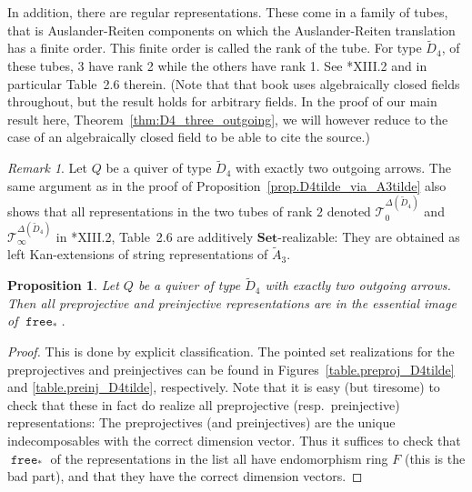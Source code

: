 \documentclass[a4paper]{amsart}
\theoremstyle{plain}
\newtheorem{proposition}[theorem]{Proposition}
\theoremstyle{definition}
\theoremstyle{remark}
\newtheorem{remark}[theorem]{Remark}
\newcommand{\funct}[1]{\operatorname{\mathtt{#1}}}
\newcommand{\Set}{\mathbf{Set}}
\begin{document}
In addition, there are regular representations. These come in a family of tubes, that is Auslander-Reiten components on which the Auslander-Reiten translation has a finite order. This finite order is called the rank of the tube. For type $\widetilde{D}_4$, of these tubes, 3 have rank 2 while the others have rank 1. See \cite{SS2}*{XIII.2} and in particular Table~2.6 therein. (Note that that book uses algebraically closed fields throughout, but the result holds for arbitrary fields. In the proof of our main result here, Theorem~\ref{thm:D4_three_outgoing}, we will however reduce to the case of an algebraically closed field to be able to cite the source.)

\begin{remark} \label{rem:T0ogTinfty}
Let $Q$ be a quiver of type $\tilde D_4$ with exactly two outgoing arrows. The same argument as in the proof of Proposition~\ref{prop.D4tilde_via_A3tilde} also shows that all representations in the two tubes of rank \( 2 \) denoted \( \mathcal{T}_0^{\Delta(\tilde D_4)} \) and \( \mathcal{T}_\infty^{\Delta(\tilde D_4)} \) in \cite{RepresentationTheoryOfArtinAlgebrasII}*{XIII.2, Table~2.6} are additively \( \Set \)-realizable: They are obtained as left Kan-extensions of string representations of \( \tilde A_3 \).
\end{remark}

\begin{proposition} \label{prop.preproj_and_preinj_are_induced}
Let $Q$ be a quiver of type $\tilde D_4$ with exactly two outgoing arrows. Then all preprojective and preinjective representations are in the essential image of \( \funct{free}_* \).
\end{proposition}

\begin{proof}
This is done by explicit classification. The pointed set realizations for the preprojectives and preinjectives can be found in Figures~\ref{table.preproj_D4tilde} and \ref{table.preinj_D4tilde}, respectively. Note that it is easy (but tiresome) to check that these in fact do realize all preprojective (resp.\ preinjective) representations: The preprojectives (and preinjectives) are the unique indecomposables with the correct dimension vector. Thus it suffices to check that \( \funct{free}_* \) of the representations in the list all have endomorphism ring \( F \) (this is the bad part), and that they have the correct dimension vectors.
\end{proof}
\end{document}
